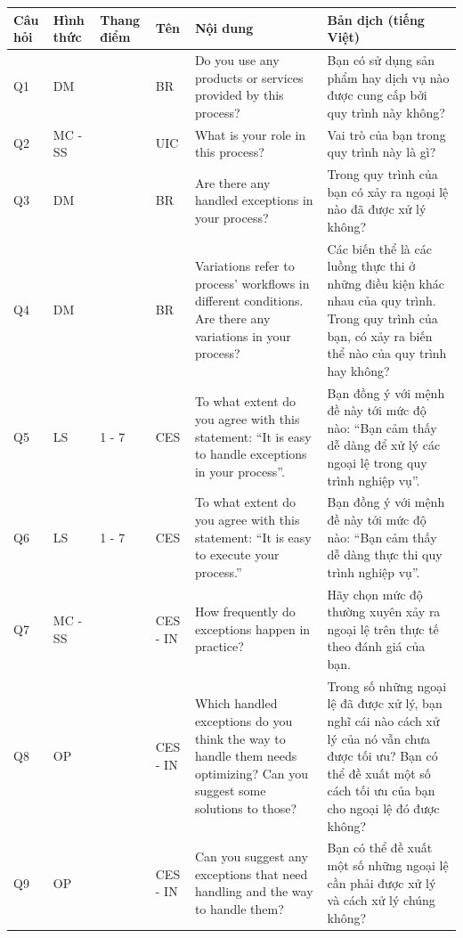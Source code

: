 \begin{center}
    \begin{tabular}{|p{1cm} |p{1cm} |p{1cm}| p{1cm} | p{5cm} | p{5cm} |}
 \hline
    Câu hỏi  & Hình thức & Thang điểm & Tên & Nội dung & Bản dịch (tiếng Việt)\\ [0.5ex] 
\hline
 Q1
 & DM

 &  & BR & Do you use any products or services provided by this process? & Bạn có sử dụng sản phẩm hay dịch vụ nào được cung cấp bởi quy trình này không? \\
 \hline
 Q2
 & MC - SS

 &  & UIC & What is your role in this process? & Vai trò của bạn trong quy trình này là gì? \\ 
 \hline
Q3 & DM &  & BR & Are there any handled exceptions in your process? & Trong quy trình của bạn có xảy ra ngoại lệ nào đã được xử lý không? \\
 \hline
  Q4 & DM & & BR & Variations refer to process’ workflows in different conditions. Are there any variations in your process? & Các biến thể là các luồng thực thi ở những điều kiện khác nhau của quy trình. Trong quy trình của bạn, có xảy ra biến thể nào của quy trình hay không?\\
 \hline
 Q5 & LS & 1 - 7 & CES & To what extent do you agree with this statement: “It is easy to handle exceptions in your process”. & Bạn đồng ý với mệnh đề này tới mức độ nào: “Bạn cảm thấy dễ dàng để xử lý các ngoại lệ trong quy trình nghiệp vụ”. \\
 \hline
 Q6 & LS & 1 - 7 & CES & To what extent do you agree with this statement: “It is easy to execute your process.” & Bạn đồng ý với mệnh đề này tới mức độ nào: “Bạn cảm thấy dễ dàng thực thi quy trình nghiệp vụ”. \\
 \hline
 Q7 & MC - SS &  & CES - IN & How frequently do exceptions happen in practice? & Hãy chọn mức độ thường xuyên xảy ra ngoại lệ trên thực tế theo đánh giá của bạn. \\
 \hline
 Q8 & OP & & CES - IN & Which handled exceptions do you think the way to handle them needs optimizing? Can you suggest some solutions to those? & Trong số những ngoại lệ đã được xử lý, bạn nghĩ cái nào cách xử lý của nó vẫn chưa được tối ưu? Bạn có thể đề xuất một số cách tối ưu của bạn cho ngoại lệ đó được không? \\
 \hline
 Q9 & OP & & CES - IN & Can you suggest any exceptions that need handling and the way to handle them? & Bạn có thể đề xuất một số những ngoại lệ cần phải được xử lý và cách xử lý chúng không? \\ [1ex]
 \hline
\end{tabular}
\end{center}
